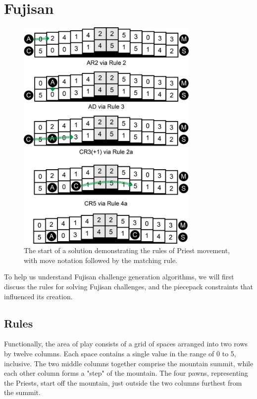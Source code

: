 \documentclass[10pt,journal,compsoc]{IEEEtran}
\begin{document}
\section{Fujisan} \label{section:fujisan}

\begin{figure}[t]
\centering
\includegraphics[width=8.8cm]{graphics/priestrulesfixed.png}
\caption{The start of a solution demonstrating the rules of Priest movement, with move notation followed by the matching rule. }
\label{fig:priestrules}
\end{figure}


To help us understand Fujisan challenge generation algorithms, we will first discuss the rules for solving Fujisan challenges, and the piecepack constraints that influenced its creation.

\subsection{Rules}
 \noindent
Functionally, the area of play consists of a grid of spaces arranged into two rows by twelve columns. Each space contains a single value in the range of 0 to 5, inclusive. The two middle columns together comprise the mountain summit, while each other column forms a "step" of the mountain. The four pawns, representing the Priests, start off the mountain, just outside the two columns furthest from the summit.
\end{document}
